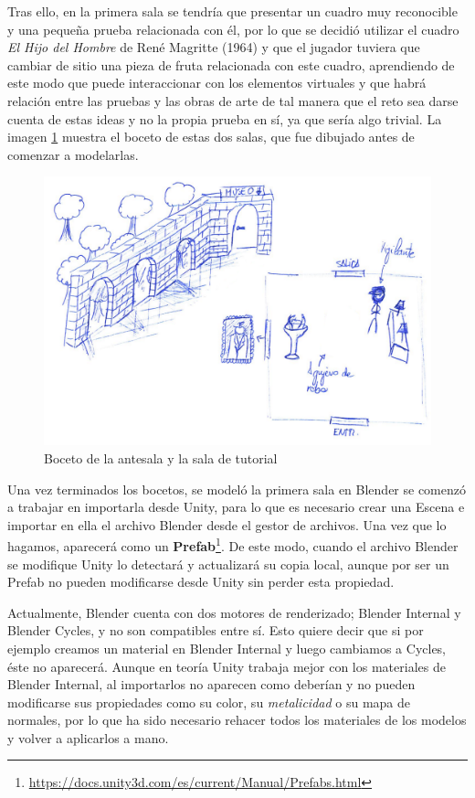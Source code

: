 Tras ello, en la primera sala se tendría que presentar un cuadro muy reconocible y una pequeña prueba relacionada con él, por lo que se decidió utilizar el cuadro \textit{El Hijo del Hombre} de René Magritte (1964) y que el jugador tuviera que cambiar de sitio una pieza de fruta relacionada con este cuadro, aprendiendo de este modo que puede interaccionar con los elementos virtuales y que habrá relación entre las pruebas y las obras de arte de tal manera que el reto sea darse cuenta de estas ideas y no la propia prueba en sí, ya que sería algo trivial. La imagen \ref{fig:bocetos-salas-0-1} muestra el boceto de estas dos salas, que fue dibujado antes de comenzar a modelarlas.

\begin{figure}[!h]
\begin{center}
\includegraphics[width=.8\textwidth]{imagenes/7/bocetos/boceto-sala-0-1.png}
\caption{Boceto de la antesala y la sala de tutorial}
\label{fig:bocetos-salas-0-1}
\end{center}
\end{figure}

Una vez terminados los bocetos, se modeló la primera sala en Blender se comenzó a trabajar en importarla desde Unity, para lo que es necesario crear una Escena e importar en ella el archivo Blender desde el gestor de archivos. Una vez que lo hagamos, aparecerá como un \textbf{Prefab}\footnote{\url{https://docs.unity3d.com/es/current/Manual/Prefabs.html}}. De este modo, cuando el archivo Blender se modifique Unity lo detectará y actualizará su copia local, aunque por ser un Prefab no pueden modificarse desde Unity sin perder esta propiedad.

Actualmente, Blender cuenta con dos motores de renderizado; Blender Internal y Blender Cycles, y no son compatibles entre sí. Esto quiere decir que si por ejemplo creamos un material en Blender Internal y luego cambiamos a Cycles, éste no aparecerá. Aunque en teoría Unity trabaja mejor con los materiales de Blender Internal, al importarlos no aparecen como deberían y no pueden modificarse sus propiedades como su color, su \textit{metalicidad} o su mapa de normales, por lo que ha sido necesario rehacer todos los materiales de los modelos y volver a aplicarlos a mano.

